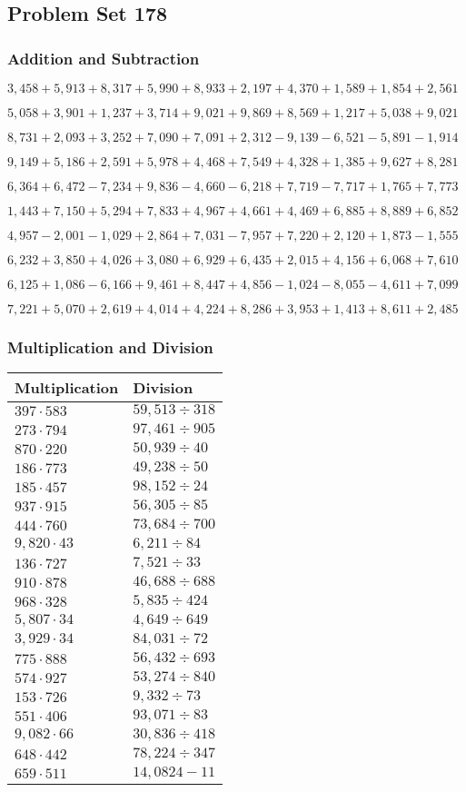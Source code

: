 \hypertarget{problem-set-178}{%
\subsection{Problem Set 178}\label{problem-set-178}}

\hypertarget{addition-and-subtraction}{%
\subsubsection{Addition and
Subtraction}\label{addition-and-subtraction}}

\(3,458+5,913+8,317+5,990+8,933+2,197+4,370+1,589+1,854+2,561\)

\(5,058+3,901+1,237+3,714+9,021+9,869+8,569+1,217+5,038+9,021\)

\(8,731+2,093+3,252+7,090+7,091+2,312-9,139-6,521-5,891-1,914\)

\(9,149+5,186+2,591+5,978+4,468+7,549+4,328+1,385+9,627+8,281\)

\(6,364+6,472-7,234+9,836-4,660-6,218+7,719-7,717+1,765+7,773\)

\(1,443+7,150+5,294+7,833+4,967+4,661+4,469+6,885+8,889+6,852\)

\(4,957-2,001-1,029+2,864+7,031-7,957+7,220+2,120+1,873-1,555\)

\(6,232+3,850+4,026+3,080+6,929+6,435+2,015+4,156+6,068+7,610\)

\(6,125+1,086-6,166+9,461+8,447+4,856-1,024-8,055-4,611+7,099\)

\(7,221+5,070+2,619+4,014+4,224+8,286+3,953+1,413+8,611+2,485\)

\hypertarget{multiplication-and-division}{%
\subsubsection{Multiplication and
Division}\label{multiplication-and-division}}

\begin{longtable}[]{@{}ll@{}}
\toprule
Multiplication & Division\tabularnewline
\midrule
\endhead
\(397\cdot583\) & \(59,513÷318\)\tabularnewline
\(273\cdot794\) & \(97,461÷905\)\tabularnewline
\(870\cdot220\) & \(50,939÷40\)\tabularnewline
\(186\cdot773\) & \(49,238÷50\)\tabularnewline
\(185\cdot457\) & \(98,152÷24\)\tabularnewline
\(937\cdot915\) & \(56,305÷85\)\tabularnewline
\(444\cdot760\) & \(73,684÷700\)\tabularnewline
\(9,820\cdot43\) & \(6,211÷ 84\)\tabularnewline
\(136\cdot727\) & \(7,521÷33\)\tabularnewline
\(910\cdot878\) & \(46,688÷688\)\tabularnewline
\(968\cdot328\) & \(5,835÷424\)\tabularnewline
\(5,807\cdot34\) & \(4,649÷649\)\tabularnewline
\(3,929\cdot34\) & \(84,031÷72\)\tabularnewline
\(775\cdot888\) & \(56,432÷693\)\tabularnewline
\(574\cdot927\) & \(53,274÷840\)\tabularnewline
\(153\cdot726\) & \(9,332÷73\)\tabularnewline
\(551\cdot406\) & \(93,071÷83\)\tabularnewline
\(9,082\cdot66\) & \(30,836÷418\)\tabularnewline
\(648\cdot442\) & \(78,224÷347\)\tabularnewline
\(659\cdot511\) & \(14,082 4-11\)\tabularnewline
\bottomrule
\end{longtable}
